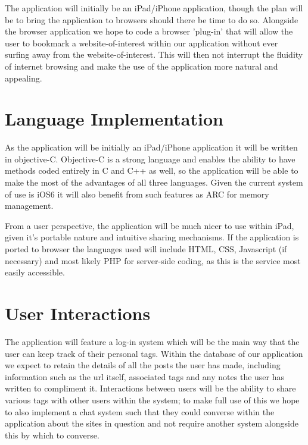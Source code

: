 \documentclass[a4wide, 10pt]{article}
\begin{document}
The application will initially be an iPad/iPhone application, though the plan will be to bring the application to browsers should there be time to do so. Alongside the browser application we hope to code a browser 'plug-in' that will allow the user to bookmark a website-of-interest within our application without ever surfing away from the website-of-interest. This will then not interrupt the fluidity of internet browsing and make the use of the application more natural and appealing.

\section{Language Implementation}

As the application will be initially an iPad/iPhone application it will be written in objective-C. Objective-C is a strong language and enables the ability to have methods coded entirely in C and C++ as well, so the application will be able to make the most of the advantages of all three languages. Given the current system of use is iOS6 it will also benefit from such features as ARC for memory management. 

From a user perspective, the application will be much nicer to use within iPad, given it's portable nature and intuitive sharing mechanisms. If the application is ported to browser the languages used will include HTML, CSS, Javascript (if necessary) and most likely PHP for server-side coding, as this is the service most easily accessible.

\section{User Interactions}

The application will feature a log-in system which will be the main way that the user can keep track of their personal tags. Within the database of our application we expect to retain the details of all the posts the user has made, including information such as the url itself, associated tags and any notes the user has written to compliment it. Interactions between users will be the ability to share various tags with other users within the system; to make full use of this we hope to also implement a chat system such that they could converse within the application about the sites in question and not require another system alongside this by which to converse. 
\end{document}
